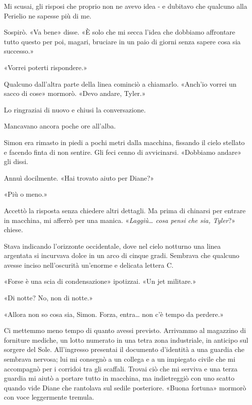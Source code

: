 Mi scusai, gli risposi che proprio non ne avevo idea - e dubitavo che
qualcuno alla Perielio ne sapesse più di me.

Sospirò. «Va bene» disse. «È solo che mi secca l'idea che dobbiamo
affrontare tutto questo per poi, magari, bruciare in un paio di giorni
senza sapere cosa sia successo.»

«Vorrei poterti rispondere.»

Qualcuno dall'altra parte della linea cominciò a chiamarlo. «Anch'io
vorrei un sacco di cose» mormorò. «Devo andare, Tyler.»

Lo ringraziai di nuovo e chiusi la conversazione.

Mancavano ancora poche ore all'alba.

Simon era rimasto in piedi a pochi metri dalla macchina, fissando il
cielo stellato e facendo finta di non sentire. Gli feci cenno di
avvicinarsi. «Dobbiamo andare» gli dissi.

Annuì docilmente. «Hai trovato aiuto per Diane?»

«Più o meno.»

Accettò la risposta senza chiedere altri dettagli. Ma prima di chinarsi
per entrare in macchina, mi afferrò per una manica.
«\emph{Laggiù\ldots{} cosa pensi che sia, Tyler}?» chiese.

Stava indicando l'orizzonte occidentale, dove nel cielo notturno una
linea argentata si incurvava dolce in un arco di cinque gradi. Sembrava
che qualcuno avesse inciso nell'oscurità un'enorme e delicata lettera C.

«Forse è una scia di condensazione» ipotizzai. «Un jet militare.»

«Di notte? No, non di notte.»

«Allora non so cosa sia, Simon. Forza, entra\ldots{} non c'è tempo da
perdere.»

\separatorefiori

Ci mettemmo meno tempo di quanto avessi previsto. Arrivammo al magazzino
di forniture mediche, un lotto numerato in una tetra zona industriale,
in anticipo sul sorgere del Sole. All'ingresso presentai il documento
d'identità a una guardia che sembrava nervosa; lui mi consegnò a un
collega e a un impiegato civile che mi accompagnò per i corridoi tra gli
scaffali. Trovai ciò che mi serviva e una terza guardia mi aiutò a
portare tutto in macchina, ma indietreggiò con uno scatto quando vide
Diane che rantolava sul sedile posteriore. «Buona fortuna» mormorò con
voce leggermente tremula.

